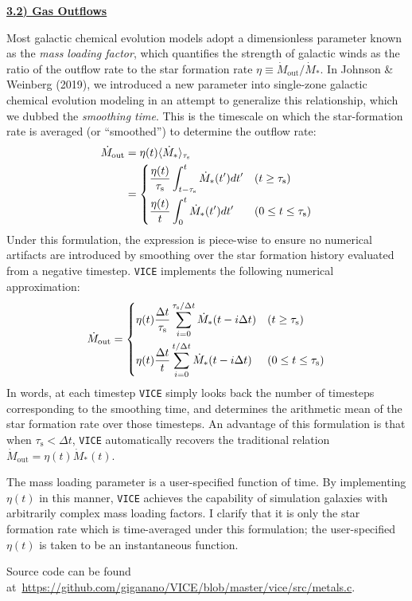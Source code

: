 \documentclass{report}
\begin{document}
\newpage
\noindent 
\begin{center}
\hypertarget{gas:outflows}{
	\underline{\LARGE
		\textbf{3.2) Gas Outflows} 
	}	
}
\end{center}
\par\noindent 
Most galactic chemical evolution models adopt a dimensionless parameter known 
as the \textit{mass loading factor}, which quantifies the strength of 
galactic winds as the ratio of the outflow rate to the star formation 
rate $\eta \equiv \dot{M}_\text{out}/\dot{M}_*$. In Johnson \& Weinberg 
(2019), we introduced a new parameter into single-zone galactic chemical 
evolution modeling in an attempt to generalize this relationship, which we 
dubbed the \textit{smoothing time}. This is the timescale on which the 
star-formation rate is averaged (or ``smoothed'') to determine the outflow 
rate: 
\begin{equation}\begin{split}
\dot{M}_\text{out} &= \eta(t)\langle\dot{M}_*\rangle_{\tau_\text{s}} \\ 
&= \begin{dcases} 
\frac{\eta(t)}{\tau_\text{s}}\int_{t - \tau_\text{s}}^t \dot{M}_*(t')dt' & 
(t \geq \tau_\text{s}) \\ 
\frac{\eta(t)}{t}\int_0^t \dot{M}_*(t')dt' & (0 \leq t \leq \tau_\text{s}) 
\end{dcases} 
\end{split}\end{equation}
Under this formulation, the expression is piece-wise to ensure no numerical 
artifacts are introduced by smoothing over the star formation history 
evaluated from a negative timestep. \texttt{VICE} implements the following 
numerical approximation: 
\begin{equation}
\dot{M}_\text{out} = 
\begin{dcases} 
\eta(t)\frac{\Delta t}{\tau_\text{s}}\sum_{i = 0}^{\tau_\text{s}/\Delta t} 
\dot{M}_*(t - i\Delta t) & (t \geq \tau_\text{s}) \\ 
\eta(t)\frac{\Delta t}{t}\sum_{i = 0}^{t/\Delta t}\dot{M}_*(t - i\Delta t) & 
(0 \leq t \leq \tau_\text{s})
\end{dcases}
\end{equation} 
In words, at each timestep \texttt{VICE} simply looks back the number of 
timesteps corresponding to the smoothing time, and determines the arithmetic 
mean of the star formation rate over those timesteps. An advantage of this 
formulation is that when $\tau_\text{s} < \Delta t$, \texttt{VICE} 
automatically recovers the traditional relation 
$\dot{M}_\text{out} = \eta(t)\dot{M}_*(t)$. 
\par
The mass loading parameter is a user-specified function of time. By 
implementing $\eta(t)$ in this manner, \texttt{VICE} achieves the capability 
of simulation galaxies with arbitrarily complex mass loading factors. I 
clarify that it is only the star formation rate which is time-averaged under 
this formulation; the user-specified $\eta(t)$ is taken to be an 
instantaneous function. 
\par
Source code can be found 
at~\url{https://github.com/giganano/VICE/blob/master/vice/src/metals.c}. 
\end{document}
